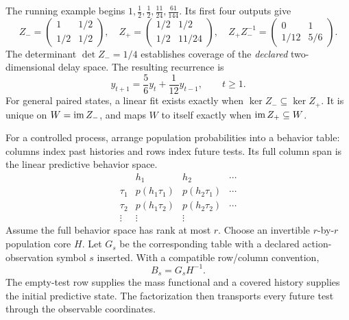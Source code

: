 \documentclass[11pt,oneside,openany]{book}
\numberwithin{equation}{section}
\begin{document}
The running example begins $1,\tfrac12,\tfrac12,\tfrac{11}{24},\tfrac{61}{144}$. Its first four outputs give
\[
Z_-=\begin{pmatrix}1&1/2\\1/2&1/2\end{pmatrix},\quad
Z_+=\begin{pmatrix}1/2&1/2\\1/2&11/24\end{pmatrix},\quad
Z_+Z_-^{-1}=\begin{pmatrix}0&1\\1/12&5/6\end{pmatrix}.
\]
The determinant $\det Z_-=1/4$ establishes coverage of the \emph{declared} two-dimensional delay space. The resulting recurrence is
\[
y_{t+1}=\frac56y_t+\frac1{12}y_{t-1},\qquad t\geq1.
\]
For general paired states, a linear fit exists exactly when $\ker Z_-\subseteq\ker Z_+$. It is unique on $W=\operatorname{im} Z_-$, and maps $W$ to itself exactly when $\operatorname{im} Z_+\subseteq W$.

For a controlled process, arrange population probabilities into a behavior table: columns index past histories and rows index future tests. Its full column span is the linear predictive behavior space.
\[
\begin{array}{c|ccc}
 & h_1 & h_2 & \cdots\\\hline
\tau_1 & p(h_1\tau_1)&p(h_2\tau_1)&\cdots\\
\tau_2 & p(h_1\tau_2)&p(h_2\tau_2)&\cdots\\
\vdots &\vdots&\vdots&
\end{array}
\]
Assume the full behavior space has rank at most $r$. Choose an invertible $r$-by-$r$ population core $H$. Let $G_s$ be the corresponding table with a declared action-observation symbol $s$ inserted. With a compatible row/column convention,
\[
\boxed{B_s=G_sH^{-1}.}
\]
The empty-test row supplies the mass functional and a covered history supplies the initial predictive state. The factorization then transports every future test through the observable coordinates.
\end{document}
